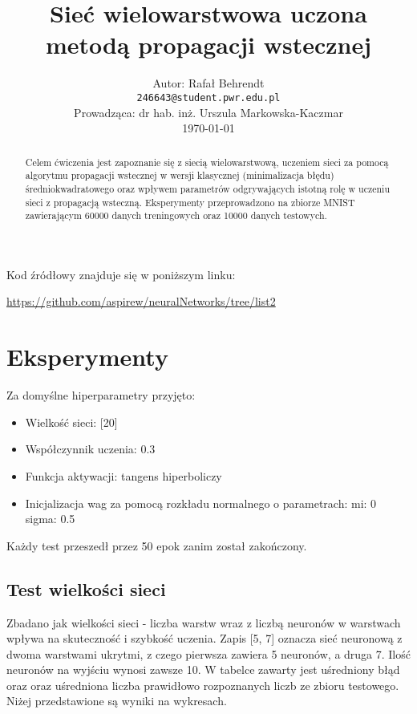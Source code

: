 \documentclass{article}
\title{ Sieć wielowarstwowa uczona metodą propagacji wstecznej  }
\author{
  Autor: Rafał Behrendt \\
  \texttt{246643@student.pwr.edu.pl} \\
  Prowadząca: dr hab. inż. Urszula Markowska-Kaczmar \\
  \today
}
\begin{document}
\maketitle

\begin{abstract}
  Celem ćwiczenia jest zapoznanie się z siecią wielowarstwową, uczeniem sieci za 
  pomocą algorytmu propagacji wstecznej w wersji klasycznej (minimalizacja błędu) 
  średniokwadratowego oraz wpływem parametrów odgrywających istotną rolę w uczeniu 
  sieci z propagacją wsteczną. Eksperymenty przeprowadzono na zbiorze MNIST zawierającym 60000 danych treningowych
  oraz 10000 danych testowych.
\end{abstract}

Kod źródłowy znajduje się w poniższym linku:

\begin{center}
  \url{https://github.com/aspirew/neuralNetworks/tree/list2}
\end{center}

\newpage
\section{Eksperymenty}

Za domyślne hiperparametry przyjęto:

\begin{itemize}
  \item Wielkość sieci: [20]
  \item Współczynnik uczenia: 0.3
  \item Funkcja aktywacji: tangens hiperboliczy
  \item Inicjalizacja wag za pomocą rozkładu normalnego o parametrach:
  \subitem mi: 0
  \subitem sigma: 0.5
\end{itemize}

Każdy test przeszedł przez 50 epok zanim został zakończony.

\subsection{Test wielkości sieci}

Zbadano jak wielkości sieci - liczba warstw wraz z liczbą neuronów w warstwach wpływa na skuteczność i szybkość uczenia.
Zapis [5, 7] oznacza sieć neuronową z dwoma warstwami ukrytmi, z czego pierwsza zawiera 5 neuronów, a druga 7.
Ilość neuronów na wyjściu wynosi zawsze 10. W tabelce zawarty jest uśredniony błąd oraz oraz uśredniona liczba prawidłowo rozpoznanych
liczb ze zbioru testowego. Niżej przedstawione są wyniki na wykresach.
\end{document}
